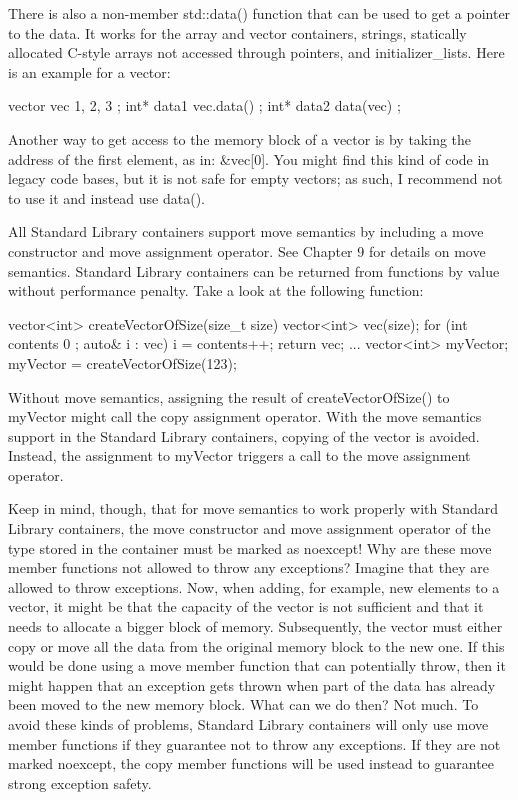 There is also a non-member std::data() function that can be used to get a pointer to the data. It works for the array and vector containers, strings, statically allocated C-style arrays not accessed through pointers, and initializer\_lists. Here is an example for a vector:

\begin{cpp}
vector vec { 1, 2, 3 };
int* data1 { vec.data() };
int* data2 { data(vec) };
\end{cpp}

Another way to get access to the memory block of a vector is by taking the address of the first element, as in: \&vec[0]. You might find this kind of code in legacy code bases, but it is not safe for empty vectors; as such, I recommend not to use it and instead use data().


All Standard Library containers support move semantics by including a move constructor and move assignment operator. See Chapter 9 for details on move semantics. Standard Library containers can be returned from functions by value without performance penalty. Take a look at the following function:

\begin{cpp}
vector<int> createVectorOfSize(size_t size)
{
    vector<int> vec(size);
    for (int contents { 0 }; auto& i : vec) { i = contents++; }
    return vec;
}
...
vector<int> myVector;
myVector = createVectorOfSize(123);
\end{cpp}

Without move semantics, assigning the result of createVectorOfSize() to myVector might call the copy assignment operator. With the move semantics support in the Standard Library containers, copying of the vector is avoided. Instead, the assignment to myVector triggers a call to the move assignment operator.

Keep in mind, though, that for move semantics to work properly with Standard Library containers, the move constructor and move assignment operator of the type stored in the container must be marked as noexcept! Why are these move member functions not allowed to throw any exceptions? Imagine that they are allowed to throw exceptions. Now, when adding, for example, new elements to a vector, it might be that the capacity of the vector is not sufficient and that it needs to allocate a bigger block of memory. Subsequently, the vector must either copy or move all the data from the original memory block to the new one. If this would be done using a move member function that can potentially throw, then it might happen that an exception gets thrown when part of the data has already been moved to the new memory block. What can we do then? Not much. To avoid these kinds of problems, Standard Library containers will only use move member functions if they guarantee not to throw any exceptions. If they are not marked noexcept, the copy member functions will be used instead to guarantee strong exception safety.

